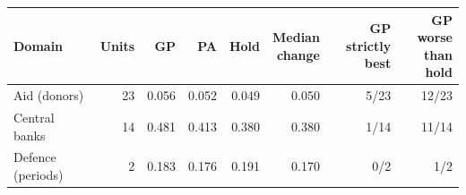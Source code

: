 \begin{tabular}{lrrrrrrr}\toprule
Domain & Units & GP & PA & Hold & \hd{Median\\change} & \hd{GP strictly\\best} & \hd{GP worse\\than hold}\\\midrule
Aid (donors) & 23 & 0.056 & 0.052 & 0.049 & 0.050 & 5/23 & 12/23\\
Central banks & 14 & 0.481 & 0.413 & 0.380 & 0.380 & 1/14 & 11/14\\
Defence (periods) & 2 & 0.183 & 0.176 & 0.191 & 0.170 & 0/2 & 1/2\\
\bottomrule\end{tabular}